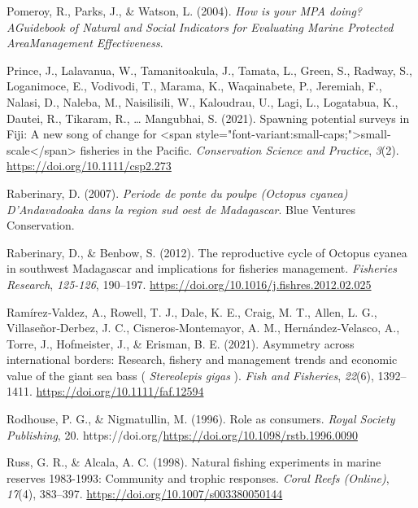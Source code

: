 \documentclass[
]{article}
\newlength{\cslhangindent}
\newlength{\cslentryspacingunit} %
\newenvironment{CSLReferences}[2] %
 {%
  \setlength{\parindent}{0pt}
  \ifodd #1
  \let\oldpar\par
  \def\par{\hangindent=\cslhangindent\oldpar}
  \fi
  \setlength{\parskip}{#2\cslentryspacingunit}
 }%
 {}
\begin{document}
\begin{CSLReferences}{1}{2}
\leavevmode{}%
Pomeroy, R., Parks, J., \& Watson, L. (2004). \emph{How is your {MPA} doing? {AGuidebook} of {Natural} and {Social} {Indicators} for {Evaluating} {Marine} {Protected} {AreaManagement} {Effectiveness}}.

\leavevmode{}%
Prince, J., Lalavanua, W., Tamanitoakula, J., Tamata, L., Green, S., Radway, S., Loganimoce, E., Vodivodi, T., Marama, K., Waqainabete, P., Jeremiah, F., Nalasi, D., Naleba, M., Naisilisili, W., Kaloudrau, U., Lagi, L., Logatabua, K., Dautei, R., Tikaram, R., \ldots{} Mangubhai, S. (2021). Spawning potential surveys in {Fiji}: {A} new song of change for {\textless{}}span style="font-variant:small-caps;"{\textgreater{}}small‐scale{\textless{}}/span{\textgreater{}} fisheries in the {Pacific}. \emph{Conservation Science and Practice}, \emph{3}(2). \url{https://doi.org/10.1111/csp2.273}

\leavevmode{}%
Raberinary, D. (2007). \emph{Periode de ponte du poulpe ({Octopus} cyanea) {D}'{Andavadoaka} dans la region sud oest de {Madagascar}}. Blue Ventures Conservation.

\leavevmode{}%
Raberinary, D., \& Benbow, S. (2012). The reproductive cycle of {Octopus} cyanea in southwest {Madagascar} and implications for fisheries management. \emph{Fisheries Research}, \emph{125-126}, 190--197. \url{https://doi.org/10.1016/j.fishres.2012.02.025}

\leavevmode{}%
Ramírez‐Valdez, A., Rowell, T. J., Dale, K. E., Craig, M. T., Allen, L. G., Villaseñor‐Derbez, J. C., Cisneros‐Montemayor, A. M., Hernández‐Velasco, A., Torre, J., Hofmeister, J., \& Erisman, B. E. (2021). Asymmetry across international borders: {Research}, fishery and management trends and economic value of the giant sea bass ( \emph{{Stereolepis} gigas} ). \emph{Fish and Fisheries}, \emph{22}(6), 1392--1411. \url{https://doi.org/10.1111/faf.12594}

\leavevmode{}%
Rodhouse, P. G., \& Nigmatullin, M. (1996). Role as consumers. \emph{Royal Society Publishing}, 20. https://doi.org/\url{https://doi.org/10.1098/rstb.1996.0090}

\leavevmode{}%
Russ, G. R., \& Alcala, A. C. (1998). Natural fishing experiments in marine reserves 1983-1993: Community and trophic responses. \emph{Coral Reefs (Online)}, \emph{17}(4), 383--397. \url{https://doi.org/10.1007/s003380050144}


\end{CSLReferences}
\end{document}
